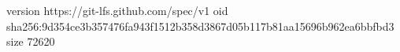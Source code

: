 version https://git-lfs.github.com/spec/v1
oid sha256:9d354ce3b357476fa943f1512b358d3867d05b117b81aa15696b962ea6bbfbd3
size 72620
